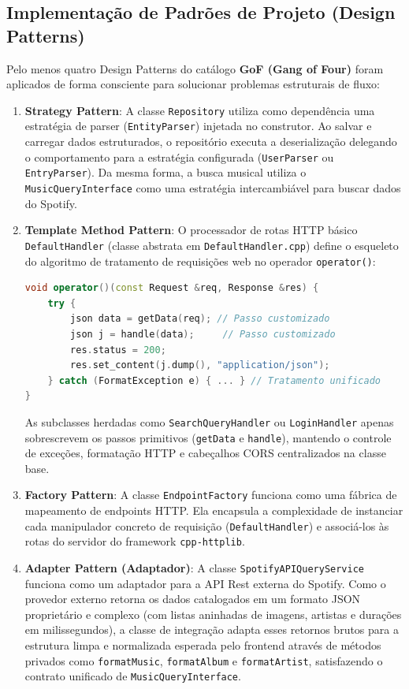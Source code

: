 \documentclass[12pt,a4paper]{article}
\begin{document}
\newpage

\subsection{Implementação de Padrões de Projeto (Design Patterns)}
Pelo menos quatro Design Patterns do catálogo \textbf{GoF (Gang of Four)} foram aplicados de forma consciente para solucionar problemas estruturais de fluxo:
\begin{enumerate}
    \item \textbf{Strategy Pattern}:
    A classe \texttt{Repository} utiliza como dependência uma estratégia de parser (\texttt{EntityParser}) injetada no construtor. Ao salvar e carregar dados estruturados, o repositório executa a deserialização delegando o comportamento para a estratégia configurada (\texttt{UserParser} ou \texttt{EntryParser}). Da mesma forma, a busca musical utiliza o \texttt{MusicQueryInterface} como uma estratégia intercambiável para buscar dados do Spotify.
    \item \textbf{Template Method Pattern}:
    O processador de rotas HTTP básico \texttt{DefaultHandler} (classe abstrata em \texttt{DefaultHandler.cpp}) define o esqueleto do algoritmo de tratamento de requisições web no operador \texttt{operator()}:
    \begin{lstlisting}[language=C++]
void operator()(const Request &req, Response &res) {
    try {
        json data = getData(req); // Passo customizado
        json j = handle(data);     // Passo customizado
        res.status = 200;
        res.set_content(j.dump(), "application/json");
    } catch (FormatException e) { ... } // Tratamento unificado
}
    \end{lstlisting}
    As subclasses herdadas como \texttt{SearchQueryHandler} ou \texttt{LoginHandler} apenas sobrescrevem os passos primitivos (\texttt{getData} e \texttt{handle}), mantendo o controle de exceções, formatação HTTP e cabeçalhos CORS centralizados na classe base.
    \item \textbf{Factory Pattern}:
    A classe \texttt{EndpointFactory} funciona como uma fábrica de mapeamento de endpoints HTTP. Ela encapsula a complexidade de instanciar cada manipulador concreto de requisição (\texttt{DefaultHandler}) e associá-los às rotas do servidor do framework \texttt{cpp-httplib}.
    \item \textbf{Adapter Pattern (Adaptador)}:
    A classe \texttt{SpotifyAPIQueryService} funciona como um adaptador para a API Rest externa do Spotify. Como o provedor externo retorna os dados catalogados em um formato JSON proprietário e complexo (com listas aninhadas de imagens, artistas e durações em milissegundos), a classe de integração adapta esses retornos brutos para a estrutura limpa e normalizada esperada pelo frontend através de métodos privados como \texttt{formatMusic}, \texttt{formatAlbum} e \texttt{formatArtist}, satisfazendo o contrato unificado de \texttt{MusicQueryInterface}.
\end{enumerate}
\end{document}
